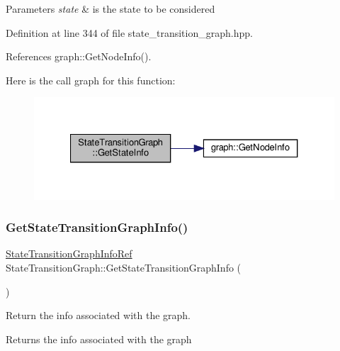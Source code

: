 \begin{DoxyParams}{Parameters}
{\em state} & is the state to be considered \\
\hline
\end{DoxyParams}


Definition at line 344 of file state\+\_\+transition\+\_\+graph.\+hpp.



References graph\+::\+Get\+Node\+Info().

Here is the call graph for this function\+:
\nopagebreak
\begin{figure}[H]
\begin{center}
\leavevmode
\includegraphics[width=327pt]{d9/d86/structStateTransitionGraph_a3499813fbff2a9cb30b5142fb570652c_cgraph}
\end{center}
\end{figure}
\mbox{\label{structStateTransitionGraph_add57cbde382f489d241dd24485435505}} 
\subsubsection{\texorpdfstring{Get\+State\+Transition\+Graph\+Info()}{GetStateTransitionGraphInfo()}}
{\footnotesize\ttfamily \hyperlink{state__transition__graph_8hpp_ad14dd7263de4e0bad3ad431954ad8252}{State\+Transition\+Graph\+Info\+Ref} State\+Transition\+Graph\+::\+Get\+State\+Transition\+Graph\+Info (\begin{DoxyParamCaption}{ }\end{DoxyParamCaption})\hspace{0.3cm}{\ttfamily [inline]}}



Return the info associated with the graph. 

\begin{DoxyReturn}{Returns}
the info associated with the graph 
\end{DoxyReturn}


